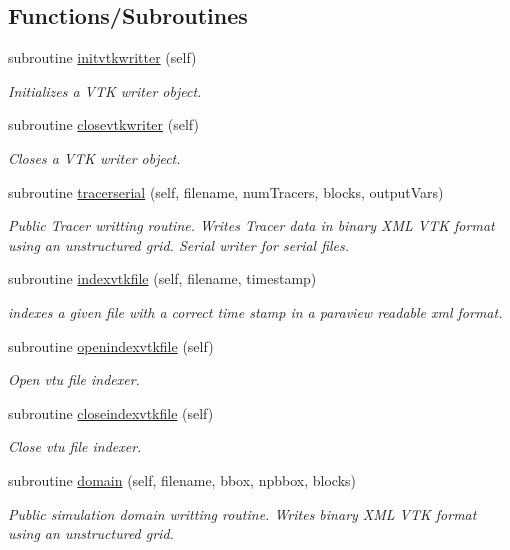\subsection*{Functions/\+Subroutines}
\begin{DoxyCompactItemize}
\item 
subroutine \mbox{\hyperlink{namespacevtkwritter__mod_abd35d591c8e15730a277b2d26deb83e8}{initvtkwritter}} (self)
\begin{DoxyCompactList}\small\item\em Initializes a V\+TK writer object. \end{DoxyCompactList}\item 
subroutine \mbox{\hyperlink{namespacevtkwritter__mod_a13f1b870d2367704bcd4143a80b552f9}{closevtkwriter}} (self)
\begin{DoxyCompactList}\small\item\em Closes a V\+TK writer object. \end{DoxyCompactList}\item 
subroutine \mbox{\hyperlink{namespacevtkwritter__mod_abe9e092f90713f5e00585f915fe86c2c}{tracerserial}} (self, filename, num\+Tracers, blocks, output\+Vars)
\begin{DoxyCompactList}\small\item\em Public Tracer writting routine. Writes Tracer data in binary X\+ML V\+TK format using an unstructured grid. Serial writer for serial files. \end{DoxyCompactList}\item 
subroutine \mbox{\hyperlink{namespacevtkwritter__mod_a4c50b52b496bad6b053ffd5749da1582}{indexvtkfile}} (self, filename, timestamp)
\begin{DoxyCompactList}\small\item\em indexes a given file with a correct time stamp in a paraview readable xml format. \end{DoxyCompactList}\item 
subroutine \mbox{\hyperlink{namespacevtkwritter__mod_a0c26bb22a8b7dd9f9da69309ad65d669}{openindexvtkfile}} (self)
\begin{DoxyCompactList}\small\item\em Open vtu file indexer. \end{DoxyCompactList}\item 
subroutine \mbox{\hyperlink{namespacevtkwritter__mod_a6f9a731d9dee5651f85d4aeed3f3ea5d}{closeindexvtkfile}} (self)
\begin{DoxyCompactList}\small\item\em Close vtu file indexer. \end{DoxyCompactList}\item 
subroutine \mbox{\hyperlink{namespacevtkwritter__mod_a9f44d9fd1c5da759c4f2d721d12a8181}{domain}} (self, filename, bbox, npbbox, blocks)
\begin{DoxyCompactList}\small\item\em Public simulation domain writting routine. Writes binary X\+ML V\+TK format using an unstructured grid. \end{DoxyCompactList}\end{DoxyCompactItemize}


